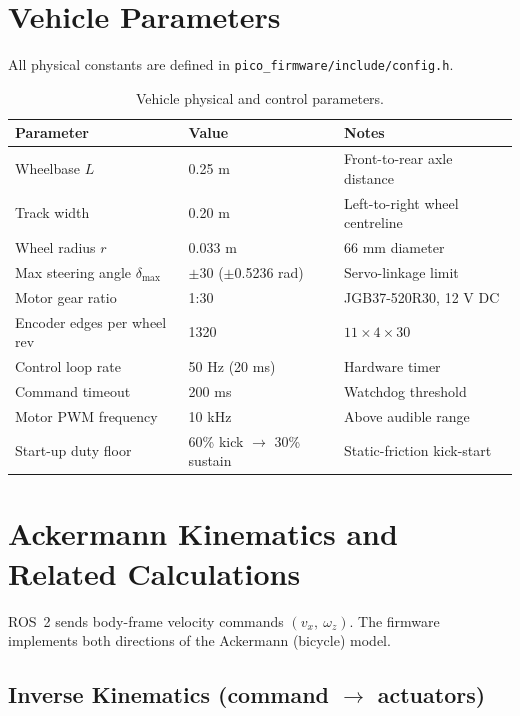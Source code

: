 \documentclass[12pt,a4paper]{report}
\begin{document}
\section{Vehicle Parameters}

All physical constants are defined in \texttt{pico\_firmware/include/config.h}.

\begin{table}[H]
\centering
\caption{Vehicle physical and control parameters.}
\label{tab:vehicle_params}
\begin{tabularx}{\textwidth}{|p{5.0cm}|p{3.2cm}|X|}
\hline
\textbf{Parameter} & \textbf{Value} & \textbf{Notes} \\
\hline
Wheelbase $L$ & 0.25 m & Front-to-rear axle distance \\
\hline
Track width & 0.20 m & Left-to-right wheel centreline \\
\hline
Wheel radius $r$ & 0.033 m & 66 mm diameter \\
\hline
Max steering angle $\delta_{\max}$ & $\pm$30\textdegree{} ($\pm$0.5236 rad) & Servo-linkage limit \\
\hline
Motor gear ratio & 1:30 & JGB37-520R30, 12 V DC \\
\hline
Encoder edges per wheel rev & 1320 & $11 \times 4 \times 30$ \\
\hline
Control loop rate & 50 Hz (20 ms) & Hardware timer \\
\hline
Command timeout & 200 ms & Watchdog threshold \\
\hline
Motor PWM frequency & 10 kHz & Above audible range \\
\hline
Start-up duty floor & 60\% kick $\rightarrow$ 30\% sustain & Static-friction kick-start \\
\hline
\end{tabularx}
\end{table}

\section{Ackermann Kinematics and Related Calculations}

ROS~2 sends body-frame velocity commands $(v_x,\ \omega_z)$. The firmware
implements both directions of the Ackermann (bicycle) model.

\subsection{Inverse Kinematics (command $\rightarrow$ actuators)}
\end{document}
